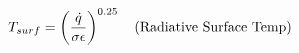 \documentclass[preview]{standalone}
\begin{document}
\begin{align*}
\special{dvisvgm:raw <g id='unique000'>}T_{surf} = \left( \frac{\dot{q}}{\sigma \epsilon} \right)^{0.25} \quad \text{(Radiative Surface Temp)}\special{dvisvgm:raw </g>}
\end{align*}
\end{document}
